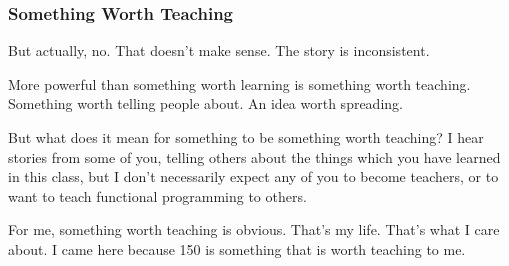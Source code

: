 \documentclass[aspectratio=169, handout]{beamer}
\begin{document}
\begin{comment}

  email me if you find that the things you learned were useless. But I wager
  most of you won’t


    i tell you stories, each lesson is a story, and this story is inconsistent.
    Well, this story is about me.
    why waste my time, why put my heart and soul into it, why spend hundreds of
    hours, why leave my friends and life behind for three months get real worked
    up about it (because it’s something worth teaching)
    Write something worth learning and then look at it, obsess, and then slow down
    and realize the issue is one word. Something worth Teaching.
    story about telling Bruno about teaching, and the fact I had to do it
\end{comment}

\begin{frame}[fragile]
  \frametitle{Something Worth Teaching}

  But actually, no. That doesn't make sense. The story is inconsistent.

  \pause
  \vspace{\fill}

  More powerful than something worth learning is something worth teaching.
  Something worth telling people about. An idea worth spreading.

  \pause
  \vspace{\fill}

  But what does it mean for something to be something worth teaching? I hear
  stories from some of you, telling others about the things which you have
  learned in this class, but I don't necessarily expect any of you to become
  teachers, or to want to teach functional programming to others.

  \pause
  \vspace{\fill}

  For me, something worth teaching is obvious. That's my life. That's what I
  care about. I came here because 150 is something that is worth teaching to me.
\end{frame}
\end{document}
